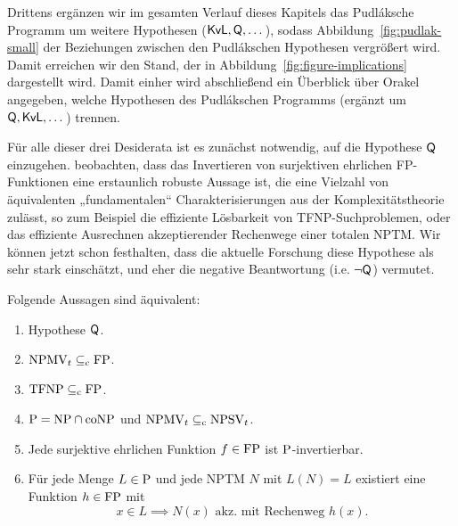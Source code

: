 
Drittens ergänzen wir im gesamten Verlauf dieses Kapitels das Pudláksche Programm um weitere Hypothesen ($\mathsf{KvL}, \hQ, \dots$), sodass Abbildung~\ref{fig:pudlak-small} der Beziehungen zwischen den Pudlákschen Hypothesen vergrößert wird. Damit erreichen wir den Stand, der in Abbildung~\ref{fig:figure-implications} dargestellt wird.
Damit einher wird abschließend ein Überblick über Orakel angegeben, welche Hypothesen des Pudlákschen Programms (ergänzt um $\hQ, \mathsf{KvL}, \dots$) trennen.


Für alle dieser drei Desiderata ist es zunächst notwendig, auf die Hypothese $\hQ$ einzugehen.
\textcite{fenner_inverting_2003} beobachten, dass das Invertieren von surjektiven ehrlichen FP-Funktionen eine erstaunlich robuste Aussage ist, die eine Vielzahl von äquivalenten „fundamentalen“ \parencite{fenner_inverting_2003} Charakterisierungen aus der Komplexitätstheorie zulässt, so zum Beispiel die effiziente Lösbarkeit von TFNP-Suchproblemen, oder das effiziente Ausrechnen akzeptierender Rechenwege einer totalen NPTM. Wir können jetzt schon festhalten, dass die aktuelle Forschung diese Hypothese als sehr stark einschätzt, und eher die negative Beantwortung (i.e. $\neg\hQ$) vermutet.


\begin{theorem}\label{thm:q-orig}
    Folgende Aussagen sind äquivalent:
    \begin{enumerate}[midpenalty=0]
        \item Hypothese $\hQ$.
        \item $\mathrm{NPMV}_t\subseteqc \mathrm{FP}$.
        \item $\TFNP\subseteqc \mathrm{FP}$.
        \item $\P=\NP\cap\coNP$ und $\mathrm{NPMV}_t\subseteqc \mathrm{NPSV}_t$.
        \item Jede surjektive ehrlichen Funktion $f\in\FP$ ist $\P$-invertierbar.
        \item Für jede Menge $L\in \P$  und jede NPTM $N$ mit $L(N)=L$ existiert eine Funktion $h\in \FP$ mit 
            \[ x\in L \implies N(x) \text{ akz. mit Rechenweg $h(x)$}. \]
    \end{enumerate}
\end{theorem}

